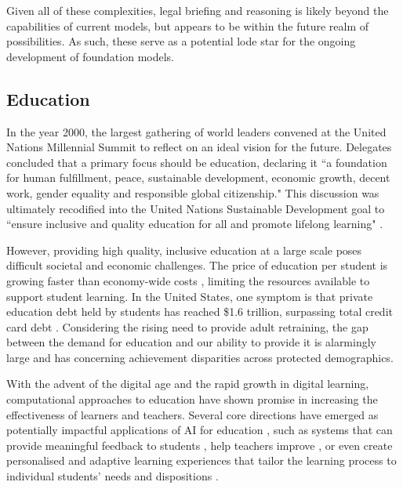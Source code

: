 Given all of these complexities, legal briefing and reasoning is likely beyond the capabilities of current models, but appears to be within the future realm of possibilities. As such, these serve as a potential lode star for the ongoing development of foundation models.

\newsection
\subsection{Education}
\label{sec:education}

In the year 2000, the largest gathering of world leaders convened at the United Nations Millennial Summit to reflect on an ideal vision for the future. Delegates concluded that a primary focus should be education, declaring it ``a foundation for human fulfillment, peace, sustainable development, economic growth, decent work, gender equality and responsible global citizenship."  This discussion was ultimately recodified into the United Nations Sustainable Development goal to ``ensure inclusive and quality education for all and promote lifelong learning" \cite{unsdg2015}.

However, providing high quality, inclusive education at a large scale poses difficult societal and economic challenges. The price of education per student is growing faster than economy-wide costs \cite{bowen2012cost}, limiting the resources available to support student learning. In the United States, one symptom is that private education debt held by students has reached \$1.6 trillion, surpassing total credit card debt \cite{friedman2020debt}. Considering the rising need to provide adult retraining, the gap between the demand for education and our ability to provide it is alarmingly large and has concerning achievement disparities across protected demographics. 

With the advent of the digital age and the rapid growth in digital learning, computational approaches to education have shown promise in increasing the effectiveness of learners and teachers. Several core directions have emerged as potentially impactful applications of AI for education \cite{woolf2013aied}, such as systems that can provide meaningful feedback to students \cite{malik2021generative}, help teachers improve \cite{jensen2020toward, demszky2021measuring, suresh2021using}, or even create personalised and adaptive learning experiences that tailor the learning process to individual students' needs and dispositions \cite{connor2019using}. 

